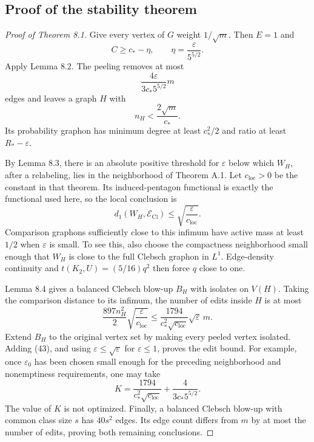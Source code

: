 \subsection{Proof of the stability theorem}

\begin{proof}[Proof of Theorem 8.1]
Give every vertex of $G$ weight $1/\sqrt m$. Then $E=1$ and
\[
 C\geq c_\ast-\eta,\qquad\eta=\frac{\varepsilon}{5^{5/2}}.
\]
Apply Lemma 8.2. The peeling removes at most
\begin{equation}\tag{43}\label{eq:43}
 \frac{4\varepsilon}{3c_\ast5^{5/2}}m
\end{equation}
edges and leaves a graph $H$ with
\[
 n_H<\frac{2\sqrt m}{c_\ast}.
\]
Its probability graphon has minimum degree at least $c_\ast^2/2$ and ratio
at least $R_\ast-\varepsilon$.

By Lemma 8.3, there is an absolute positive threshold for $\varepsilon$
below which $W_H$, after a relabeling, lies in the neighborhood of Theorem
A.1. Let $c_{\mathrm{loc}}>0$ be the constant in that theorem. Its
induced-pentagon functional is exactly the functional used here, so the
local conclusion is
\[
 d_1(W_H,\mathcal E_{\mathrm{Cl}})\leq
 \sqrt{\frac{\varepsilon}{c_{\mathrm{loc}}}}.
\]
Comparison graphons sufficiently close to this infimum have active mass
at least $1/2$ when $\varepsilon$ is small. To see this, also choose the
compactness neighborhood small enough that $W_H$ is close to the full
Clebsch graphon in $L^1$. Edge-density continuity and
$t(K_2,U)=(5/16)q^2$ then force $q$ close to one.

Lemma 8.4 gives a balanced Clebsch blow-up $B_H$ with isolates on $V(H)$.
Taking the comparison distance to its infimum, the number of edits inside
$H$ is at most
\[
 \frac{897n_H^2}2\sqrt{\frac{\varepsilon}{c_{\mathrm{loc}}}}
 \leq\frac{1794}{c_\ast^2\sqrt{c_{\mathrm{loc}}}}
 \sqrt\varepsilon\,m.
\]
Extend $B_H$ to the original vertex set by making every peeled vertex
isolated. Adding (43), and using $\varepsilon\leq\sqrt\varepsilon$ for
$\varepsilon\leq1$, proves the edit bound. For example, once
$\varepsilon_0$ has been chosen small enough for the preceding neighborhood
and nonemptiness requirements, one may take
\[
 K=\frac{1794}{c_\ast^2\sqrt{c_{\mathrm{loc}}}}
   +\frac4{3c_\ast5^{5/2}}.
\]
The value of $K$ is not optimized. Finally, a balanced Clebsch blow-up with
common class size $s$ has $40s^2$ edges. Its edge count differs from $m$ by
at most the number of edits, proving both remaining conclusions.
\end{proof}

